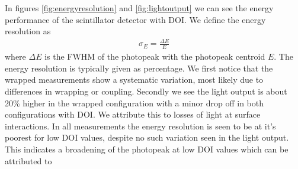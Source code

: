 In figures \ref{fig:energyresolution} and \ref{fig:lightoutput} we can see the energy performance of the scintillator detector with DOI. We define the energy resolution as
\begin{align}
\sigma_E = \frac{\Delta E}{E}
\end{align}
where $\Delta E$ is the FWHM of the photopeak with the photopeak centroid $E$. The energy resolution is typically given as percentage. We first notice that the wrapped measurements show a systematic variation, most likely due to differences in wrapping or coupling. Secondly we see the light output is about 20\% higher in the wrapped configuration with a minor drop off in both configurations with DOI. We attribute this to losses of light at surface interactions. In all measurements the energy resolution is seen to be at it's poorest for low DOI values, despite no such variation seen in the light output. This indicates a broadening of the photopeak at low DOI values which can be attributed to 